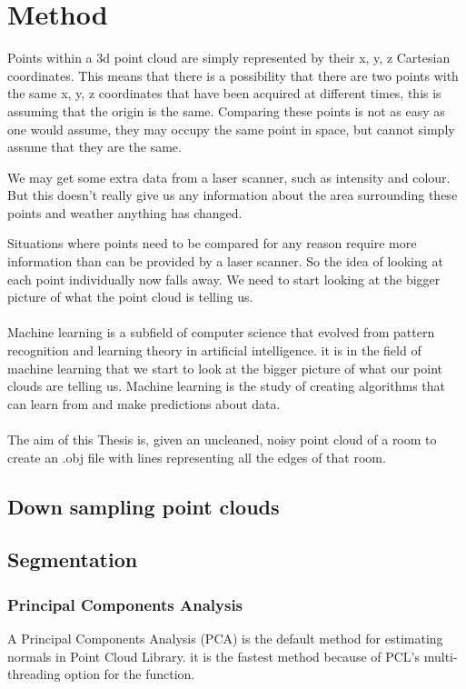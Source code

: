 
\chapter{Method}
	
	Points within a 3d point cloud are simply represented by their x, y, z Cartesian coordinates. This means that there is a possibility that there are two points with the same x, y, z coordinates that have been acquired at different times, this is assuming that the origin is the same. Comparing these points is not as easy as one would assume, they may occupy the same point in space, but cannot simply assume that they are the same.
	
	We may get some extra data from a laser scanner, such as intensity and colour. But this doesn't really give us any information about the area surrounding these points and weather anything has changed.
	
	Situations where points need to be compared for any reason require more information than can be provided by a laser scanner. So the idea of looking at each point individually now falls away. We need to start looking at the bigger picture of what the point cloud is telling us.\\
	\\
	Machine learning is a subfield of computer science that evolved from pattern recognition and learning theory in artificial intelligence. it is in the field of machine learning that we start to look at the bigger picture of what our point clouds are telling us. Machine learning is the study of creating algorithms that can learn from and make predictions about data.\\
	\\
	The aim of this Thesis is, given an uncleaned, noisy point cloud of a room to create an .obj file with lines representing all the edges of that room.
	
	
\section{Down sampling point clouds}
	
	
\section{Segmentation}
	\label{segmentation-method}
	\subsection{Principal Components Analysis}
		A Principal Components Analysis (PCA) is the default method for estimating normals in Point Cloud Library. it is the fastest method because of PCL's multi-threading option for the function.
		
